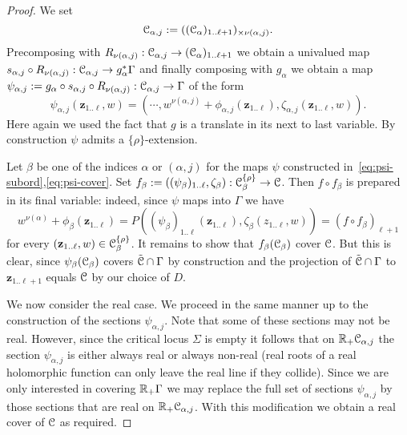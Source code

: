\documentclass[reqno]{amsart}
\renewcommand\~[1]{\widetilde{#1}}
\def\vz{{\mathbf z}}
\def\he#1{{\{#1\}}}
\def\hrho{{\he\rho}}
\begin{document}
\begin{proof}
  We set
  \begin{equation}
    {\mathcal C}_{\alpha,j} := (({\mathcal C}_\alpha)_{1..\ell+1})_{\times\nu(\alpha,j)}.
  \end{equation}
  Precomposing with
  $R_{\nu(\alpha,j)}:{\mathcal C}_{\alpha,j}\to({\mathcal C}_\alpha)_{1..\ell+1}$ we
  obtain a univalued map
  $s_{\alpha,j}\circ R_{\nu(\alpha,j)}:{\mathcal C}_{\alpha,j}\to
  g_\alpha^*\Gamma$ and finally composing with $g_\alpha$ we obtain a
  map
  $\psi_{\alpha,j}:=g_\alpha\circ s_{\alpha,j}\circ
  R_{\nu(\alpha,j)}:{\mathcal C}_{\alpha,j}\to\Gamma$ of the form
  \begin{equation}\label{eq:psi-cover}
    \psi_{\alpha,j}(\vz_{1..\ell},w) = (\cdots,w^{\nu(\alpha,j)}+\phi_{\alpha,j}(\vz_{1..\ell}),\zeta_{\alpha,j}(\vz_{1..\ell},w)).
  \end{equation}
  Here again we used the fact that $g$ is a translate in its next to
  last variable. By construction $\psi$ admits a $\hrho$-extension.

  Let $\beta$ be one of the indices $\alpha$ or $(\alpha,j)$ for the
  maps $\psi$ constructed
  in~\eqref{eq:psi-subord},\eqref{eq:psi-cover}. Set
  $f_\beta:=((\psi_\beta)_{1..\ell},\zeta_\beta):\cC_\beta^\hrho\to\cC$. Then
  $f\circ f_\beta$ is prepared in its final variable: indeed, since
  $\psi$ maps into $\Gamma$ we have
  \begin{equation}
    w^{\nu(\alpha)}+\phi_\beta(\vz_{1..\ell})=P((\psi_\beta)_{1..\ell}(\vz_{1..\ell}),\zeta_\beta(z_{1..\ell},w))
    = (f\circ f_\beta)_{\ell+1}
  \end{equation}
  for every $(\vz_{1..\ell},w)\in\cC_\beta^\hrho$. It remains to show
  that $f_\beta({\mathcal C}_\beta)$ cover ${\mathcal C}$. But this is clear, since
  $\psi_\beta({\mathcal C}_\beta)$ covers $\tilde{{\mathcal C}}\cap\Gamma$ by construction
  and the projection of $\tilde{{\mathcal C}}\cap\Gamma$ to $\vz_{1..\ell+1}$
  equals ${\mathcal C}$ by our choice of $D$.

  We now consider the real case. We proceed in the same manner up to
  the construction of the sections $\psi_{\alpha,j}$. Note that some
  of these sections may not be real. However, since the critical locus
  $\Sigma$ is empty it follows that on ${\mathbb R}_+{\mathcal C}_{\alpha,j}$ the
  section $\psi_{\alpha,j}$ is either always real or always non-real
  (real roots of a real holomorphic function can only leave the real
  line if they collide). Since we are only interested in covering
  ${\mathbb R}_+\Gamma$ we may replace the full set of sections
  $\psi_{\alpha,j}$ by those sections that are real on
  ${\mathbb R}_+{\mathcal C}_{\alpha,j}$. With this modification we obtain a real cover
  of ${\mathcal C}$ as required.
\end{proof}
\end{document}
